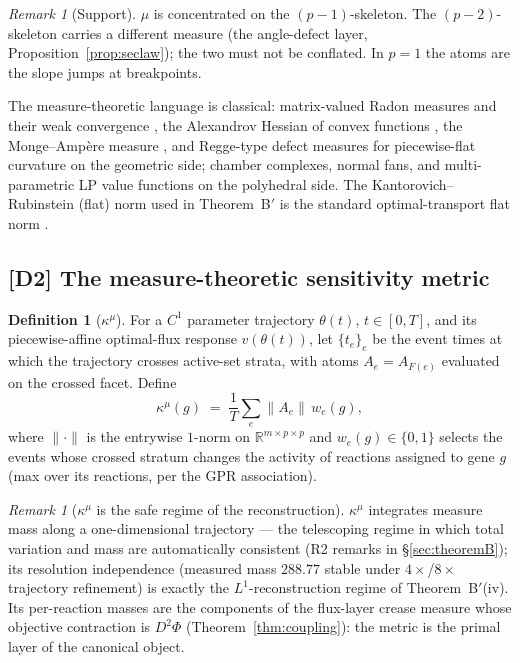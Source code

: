 \documentclass[11pt,a4paper]{article}
\theoremstyle{plain}
\theoremstyle{definition}
\newtheorem{definition}[theorem]{Definition}
\theoremstyle{remark}
\newtheorem{remark}[theorem]{Remark}
\newcommand{\kmu}{\kappa^{\mu}}
\newcommand{\RR}{\mathbb{R}}
\begin{document}
\begin{remark}[Support]\label{rem:support}
$\mu$ is concentrated on the $(p-1)$-skeleton. The $(p-2)$-skeleton carries
a different measure (the angle-defect layer,
Proposition~\ref{prop:seclaw}); the two must not be conflated. In $p=1$ the
atoms are the slope jumps at breakpoints.
\end{remark}

The measure-theoretic language is classical: matrix-valued Radon
measures and their weak convergence \citep{billingsley1999}, the
Alexandrov Hessian of convex functions \citep{alexandrov1939}, the
Monge--Amp\`ere measure \citep{gutierrez2001}, and Regge-type defect
measures for piecewise-flat curvature \citep{regge1961, cheeger1984} on
the geometric side; chamber complexes, normal fans, and multi-parametric
LP value functions \citep{rockafellar1970, ziegler1995, borrelli2003} on
the polyhedral side. The Kantorovich--Rubinstein (flat) norm used in
Theorem~B$'$ is the standard optimal-transport flat norm
\citep{villani2009}.

\subsection{[D2] The measure-theoretic sensitivity metric}

\begin{definition}[$\kmu$]\label{def:kmu}
For a $C^1$ parameter trajectory $\theta(t)$, $t \in [0,T]$, and its
piecewise-affine optimal-flux response $v(\theta(t))$, let
$\{t_e\}_e$ be the event times at which the trajectory crosses active-set
strata, with atoms $A_e = A_{F(e)}$ evaluated on the crossed facet. Define
\[
\kmu(g) \;=\; \frac{1}{T}\sum_{e} \bigl\| A_e \bigr\| \, w_e(g),
\]
where $\|{\cdot}\|$ is the entrywise $1$-norm on
$\RR^{m \times p \times p}$ and $w_e(g) \in \{0,1\}$ selects the events
whose crossed stratum changes the activity of reactions assigned to gene
$g$ (max over its reactions, per the GPR association).
\end{definition}

\begin{remark}[$\kmu$ is the safe regime of the reconstruction]
$\kmu$ integrates measure mass along a one-dimensional trajectory --- the
telescoping regime in which total variation and mass are automatically
consistent (R2 remarks in \S\ref{sec:theoremB}); its resolution
independence (measured mass $288.77$ stable under $4\times$/$8\times$
trajectory refinement) is exactly the $L^1$-reconstruction regime of
Theorem~B$'$(iv). Its per-reaction masses are the components of the
flux-layer crease measure whose objective contraction is $D^2\Phi$
(Theorem~\ref{thm:coupling}): the metric is the primal layer of the
canonical object.
\end{remark}
\end{document}
